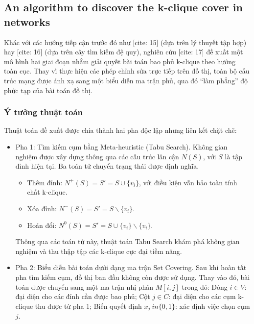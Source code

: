 


\subsection{An algorithm to discover the k-clique cover in networks~\cite{cavique2009algorithm}}


Khác với các hướng tiếp cận trước đó như [cite: 15] (dựa trên lý thuyết tập hợp) hay [cite: 16] (dựa trên cây tìm kiếm đệ quy), nghiên cứu [cite: 17] đề xuất một mô hình hai giai đoạn nhằm giải quyết bài toán bao phủ k-clique theo hướng toàn cục. Thay vì thực hiện các phép chỉnh sửa trực tiếp trên đồ thị, toàn bộ cấu trúc mạng được ánh xạ sang một biểu diễn ma trận phủ, qua đó ``làm phẳng'' độ phức tạp của bài toán đồ thị.

\subsubsection{Ý tưởng thuật toán}

Thuật toán đề xuất được chia thành hai pha độc lập nhưng liên kết chặt chẽ:
\begin{itemize}
	\item Pha 1: Tìm kiếm cụm bằng Meta-heuristic (Tabu Search). Không gian nghiệm được xây dựng thông qua các cấu trúc lân cận $N(S)$, với $S$ là tập đỉnh hiện tại. Ba toán tử chuyển trạng thái được định nghĩa.
	\begin{itemize}
		\item Thêm đỉnh: $N^+(S)={S'=S \cup \{v_i\}}$, với điều kiện vẫn bảo toàn tính chất k-clique.
		\item Xóa đỉnh: $N^-(S)={S'=S \backslash \{v_i\}}$.
		\item Hoán đổi: $N^0(S)={S'=S \cup \{v_i\} \backslash \{v_i\}}$.
	\end{itemize}
	Thông qua các toán tử này, thuật toán Tabu Search khám phá không gian nghiệm và thu thập tập các k-clique cực đại tiềm năng.
	
	\item Pha 2: Biểu diễn bài toán dưới dạng ma trận Set Covering. Sau khi hoàn tất pha tìm kiếm cụm, đồ thị ban đầu không còn được sử dụng. Thay vào đó, bài toán được chuyển sang một ma trận nhị phân $M[i,j]$ trong đó: Dòng  $i \in V$: đại diện cho các đỉnh cần được bao phủ; Cột $j \in C$: đại diện cho các cụm k-clique thu được từ pha 1; Biến quyết định $x_j \ in \{0,1\}$: xác định việc chọn cụm $j$.
	
	
\end{itemize}



















